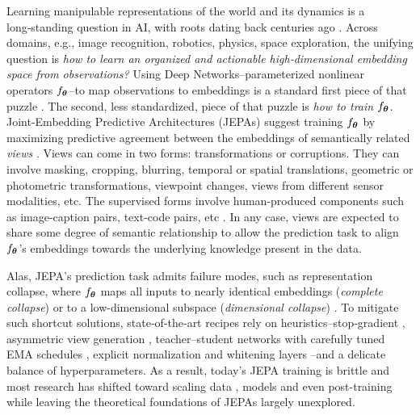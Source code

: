 Learning manipulable representations of the world and its dynamics is a long‑standing question in AI, with roots dating back centuries ago \citep{von1867handbuch,tolman1948cognitive,gregory1980perceptions,sutton1991dyna,friston2010free}. Across domains, e.g., image recognition, robotics, physics, space exploration, the unifying question is {\em how to learn an organized and actionable high‑dimensional embedding space from observations?} Using Deep Networks--parameterized nonlinear operators $f_{{\bm{\theta}}}$--to map observations to embeddings is a standard first piece of that puzzle \citep{lecun2015deep,goodfellow2016deep}. The second, less standardized, piece of that puzzle is {\em how to train $f_{{\bm{\theta}}}$}. Joint-Embedding Predictive Architectures (JEPAs) suggest training $f_{{\bm{\theta}}}$ by maximizing predictive agreement between the embeddings of semantically related {\em views} \citep{bromley1993signature,lecun2022path,balestriero2023cookbook}. Views can come in two forms: transformations or corruptions.  They can involve masking, cropping, blurring, temporal or spatial translations, geometric or photometric transformations, viewpoint changes, views from different sensor modalities, etc. The supervised forms involve human-produced components such as image-caption pairs, text-code pairs, etc \citep{tian2020makes}. In any case, views are expected to share some degree of semantic relationship to allow the prediction task to align $f_{{\bm{\theta}}}$'s embeddings towards the underlying knowledge present in the data.



Alas, JEPA's prediction task admits failure modes, such as representation collapse, where $f_{{\bm{\theta}}}$ maps all inputs to 
nearly identical embeddings ({\em complete collapse}) or to a low-dimensional subspace 
({\em dimensional collapse}) \citep{jing2021understanding}\citep{jing2021understanding,cosentino2022toward,balestriero2022contrastive}. To mitigate such shortcut solutions, state‑of‑the‑art recipes rely on heuristics--stop‑gradient \citep{chen2020simple}, asymmetric view generation \citep{wang2022importance}, teacher–student networks with carefully tuned EMA schedules \citep{caron2021emerging,tian2021understanding}, explicit normalization and whitening layers \citep{ermolov2021whitening,chen2021empirical}--and a delicate balance of hyperparameters. As a result, today's JEPA training is brittle and most research has shifted toward scaling data \citep{vo2024automatic}, models \citep{fan2025scaling} and even post-training \cite{rodas2025diet} while leaving the theoretical foundations of JEPAs largely unexplored.


